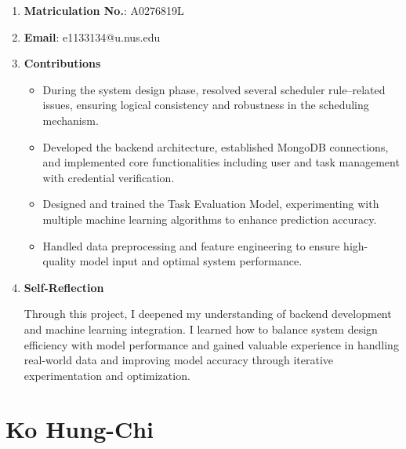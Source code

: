 \documentclass[12pt, a4paper]{article}
\begin{document}
    \begin{enumerate}
        \item \textbf{Matriculation No.}: A0276819L
        \item \textbf{Email}: e1133134@u.nus.edu
        \item \textbf{Contributions}

            \begin{itemize}
                \item During the system design phase, resolved several scheduler rule–related issues, ensuring logical consistency and robustness in the scheduling mechanism.
                \item Developed the backend architecture, established MongoDB connections, and implemented core functionalities including user and task management with credential verification.
                \item Designed and trained the Task Evaluation Model, experimenting with multiple machine learning algorithms to enhance prediction accuracy.
                \item Handled data preprocessing and feature engineering to ensure high-quality model input and optimal system performance.
            \end{itemize}
        
        \item \textbf{Self-Reflection}
        
            Through this project, I deepened my understanding of backend development and machine learning integration. I learned how to balance system design efficiency with model performance and gained valuable experience in handling real-world data and improving model accuracy through iterative experimentation and optimization.
    \end{enumerate}


    
\section{Ko Hung-Chi} 
\end{document}
